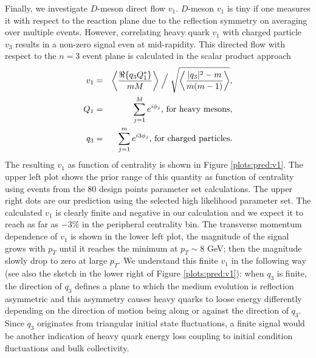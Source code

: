 \documentclass[aps, prc, reprint, amsmath, groupedaddress, nofootinbib]{revtex4-1}
\begin{document}
Finally, we investigate $D$-meson direct flow $v_1$.
$D$-meson $v_1$ is tiny if one measures it with respect to the reaction plane due to the reflection symmetry on averaging over multiple events.
However, correlating heavy quark $v_1$ with charged particle $v_3$ results in a non-zero signal even at mid-rapidity.
This directed flow with respect to the $n=3$ event plane is calculated in the scalar product approach
\begin{eqnarray}
v_1 &=& \left\langle \frac{\Re\{q_3 Q_1^*\}}{mM} \right\rangle\Bigm/\sqrt{\left\langle \frac{|q_3|^2-m}{m(m-1)} \right\rangle}, \nonumber\\
Q_1 &=& \sum_{j=1}^{M}e^{i\phi_j} \textrm{, for heavy mesons},\nonumber\\
q_3 &=& \sum_{j=1}^{m}e^{i3\phi_j} \textrm{, for charged particles}. 
\end{eqnarray}
The resulting $v_1$ as function of centrality is shown in Figure \ref{plots:pred:v1}.
The upper left plot shows the prior range of this quantity as function of centrality using events from the 80 design points parameter set calculations.
The upper right dots are our prediction using the selected high likelihood parameter set.
The calculated $v_1$ is clearly finite and negative in our calculation and we expect it to reach as far as $-3\%$ in the peripheral centrality bin.
The transverse momentum dependence of $v_1$ is shown in the lower left plot, the magnitude of the signal grows with $p_T$ until it reaches the minimum at $p_T \sim 8$ GeV; then the magnitude slowly drop to zero at large $p_T$.
We understand this finite $v_1$ in the following way
(see also the sketch in the lower right of Figure \ref{plots:pred:v1}):
when $q_3$ is finite, the direction of $q_3$ defines a plane to which the medium evolution is reflection asymmetric and this asymmetry causes heavy quarks to loose energy differently depending on the direction of motion being along or against the direction of $q_3$.
Since $q_3$ originates from triangular initial state fluctuations, a finite signal would be another indication of heavy quark energy loss coupling to initial condition fluctuations and bulk collectivity.
\end{document}

